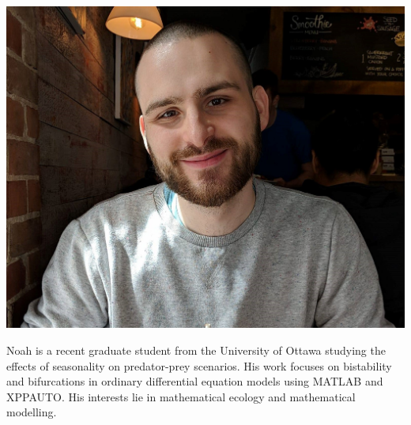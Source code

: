 \documentclass{beamer}
\begin{document}
\begin{frame}
\vspace{10pt}
\begin{minipage}[b]{0.15\textwidth}
\includegraphics[width=\textwidth, trim={70pt 0pt 70pt 0pt}, clip]{TeamPics/Noah.jpg}
\end{minipage}\hspace{0.05\textwidth}%
\begin{minipage}[b]{0.8\textwidth}
{\small Noah is a recent graduate student from the University of Ottawa studying the effects of seasonality on predator-prey scenarios. His work focuses on bistability and bifurcations in ordinary differential equation models using MATLAB and XPPAUTO. His interests lie in mathematical ecology and mathematical modelling.}
\end{minipage}


\end{frame}
\end{document}
